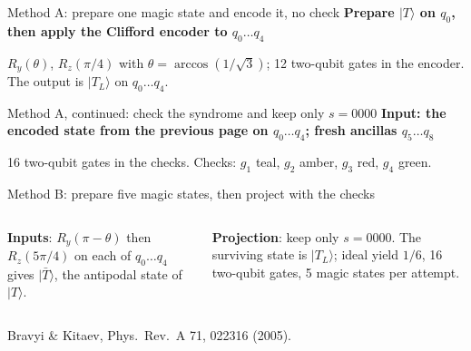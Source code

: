 \documentclass[aspectratio=169,10pt]{beamer}
\newcommand{\src}[1]{\vfill{\scriptsize\color{dim}#1}\vspace{1.3em}}
\newcommand{\ket}[1]{|#1\rangle}
\begin{document}
\begin{frame}{Method A: prepare one magic state and encode it, no check}
  \centering
  \vspace{0.4em}
  {\footnotesize\bfseries\color{pri}Prepare $\ket T$ on $q_0$, then apply the Clifford encoder to $q_0\ldots q_4$}\\[6pt]
  \scalebox{1.2}{\begin{tikzpicture}\end{tikzpicture}}

  \vspace{0.8em}
  {\scriptsize $R_y(\theta)$, $R_z(\pi/4)$ with $\theta=\arccos(1/\sqrt3)$; 12 two-qubit gates in the encoder. The output is $\ket{T_L}$ on $q_0\ldots q_4$.}
\end{frame}

\begin{frame}{Method A, continued: check the syndrome and keep only $s=0000$}
  \centering
  {\footnotesize\bfseries\color{pri}Input: the encoded state from the previous page on $q_0\ldots q_4$; fresh ancillas $q_5\ldots q_8$}\\[4pt]
  \scalebox{1.35}{\begin{tikzpicture}\end{tikzpicture}}

  \vspace{0.4em}
  {\scriptsize 16 two-qubit gates in the checks. Checks: $g_1$ teal, $g_2$ amber, $g_3$ red, $g_4$ green.}
\end{frame}

\begin{frame}{Method B: prepare five magic states, then project with the checks}
  \centering
  \begin{tikzpicture}\end{tikzpicture}

  \vspace{0.6em}
  \begin{columns}[T]
    \small\raggedright
    \textbf{Inputs}: $R_y(\pi-\theta)$ then $R_z(5\pi/4)$ on each of $q_0\ldots q_4$ gives $\ket{\bar T}$, the antipodal state of $\ket T$.
    \small\raggedright
    \textbf{Projection}: keep only $s=0000$. The surviving state is $\ket{T_L}$; ideal yield $1/6$, 16 two-qubit gates, 5 magic states per attempt.
  \end{columns}
  \src{Bravyi \& Kitaev, Phys.\ Rev.\ A 71, 022316 (2005).}
\end{frame}
\end{document}
